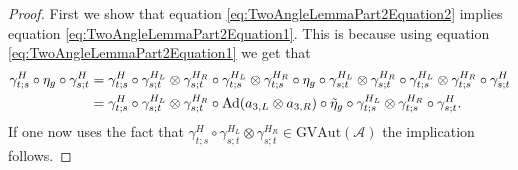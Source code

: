 \documentclass[12pt,a4paper,twoside]{article}
\let\originalleft\left
\let\originalright\right
\renewcommand{\left}{\mathopen{}\mathclose\bgroup\originalleft}
\renewcommand{\right}{\aftergroup\egroup\originalright}
\renewcommand{\AA}{\mathcal A}
\newcommand{\Ad}[1]{\textrm{Ad}\left(#1\right)}
\theoremstyle{definition}
\numberwithin{equation}{section}
\begin{document}
\begin{proof}
	First we show that equation \eqref{eq:TwoAngleLemmaPart2Equation2} implies equation \eqref{eq:TwoAngleLemmaPart2Equation1}. This is because using equation \eqref{eq:TwoAngleLemmaPart2Equation1} we get that
	\begin{align}
		\gamma^H_{t;s}\circ\eta_g\circ\gamma^{H}_{s;t}&=\gamma^H_{t;s}\circ\gamma^{H_L}_{s;t}\otimes\gamma^{H_R}_{s;t}\circ\gamma^{H_L}_{t;s}\otimes\gamma^{H_R}_{t;s}\circ\eta_g\circ\gamma^{H_L}_{s;t}\otimes\gamma^{H_R}_{s;t}\circ\gamma^{H_L}_{t;s}\otimes\gamma^{H_R}_{t;s}\circ\gamma^H_{s;t}\\
		&=\gamma^H_{t;s}\circ\gamma^{H_L}_{s;t}\otimes\gamma^{H_R}_{s;t}\circ\Ad{a_{3,L}\otimes a_{3,R}}\circ\tilde{\eta}_g\circ\gamma^{H_L}_{t;s}\otimes\gamma^{H_R}_{t;s}\circ\gamma^H_{s;t}.
	\end{align}
	If one now uses the fact that $\gamma^H_{t;s}\circ\gamma^{H_L}_{s;t}\otimes\gamma^{H_R}_{s;t}\in\textrm{GVAut}(\AA)$ the implication follows.
\end{proof}


\end{document}
